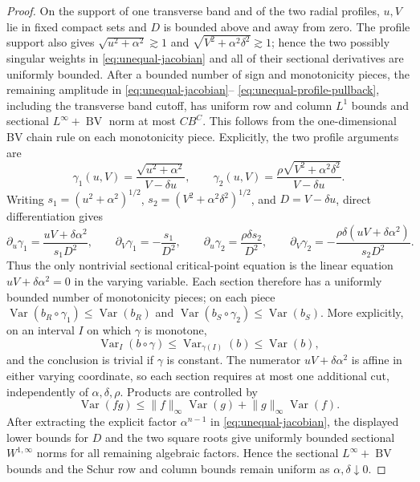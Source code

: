 \documentclass[11pt]{article}
\numberwithin{equation}{section}
\theoremstyle{remark}
\theoremstyle{definition}
\newcommand{\Var}{\operatorname{Var}}
\newcommand{\norm}[1]{\lVert #1\rVert}
\newcommand{\BV}{\operatorname{BV}}
\begin{document}
\begin{proof}
On the support of one transverse band and of the two radial profiles,
\(u,V\) lie in fixed compact sets and \(D\) is bounded above and away
from zero.  The profile support also gives
\(\sqrt{u^2+\alpha^2}\gtrsim1\) and
\(\sqrt{V^2+\alpha^2\delta^2}\gtrsim1\); hence the two possibly singular
weights in \eqref{eq:unequal-jacobian} and all of their sectional
derivatives are uniformly bounded.  After a bounded number of sign and
monotonicity pieces, the remaining amplitude in
\eqref{eq:unequal-jacobian}--
\eqref{eq:unequal-profile-pullback}, including the transverse band
cutoff, has uniform row and column \(L^1\) bounds and sectional
\(L^\infty+\BV\) norm at most \(CB^C\).  This follows from the
one-dimensional BV chain rule on each monotonicity piece.  Explicitly,
the two profile arguments are
\[
 \gamma_1(u,V)=\frac{\sqrt{u^2+\alpha^2}}{V-\delta u},\qquad
 \gamma_2(u,V)=
 \frac{\rho\sqrt{V^2+\alpha^2\delta^2}}{V-\delta u}.
\]
Writing $s_1=(u^2+\alpha^2)^{1/2}$,
$s_2=(V^2+\alpha^2\delta^2)^{1/2}$, and $D=V-\delta u$, direct
differentiation gives
\[
 \partial_u\gamma_1=\frac{uV+\delta\alpha^2}{s_1D^2},\qquad
 \partial_V\gamma_1=-\frac{s_1}{D^2},\qquad
 \partial_u\gamma_2=\frac{\rho\delta s_2}{D^2},\qquad
 \partial_V\gamma_2=-\frac{\rho\delta(uV+\delta\alpha^2)}{s_2D^2}.
\]
Thus the only nontrivial sectional critical-point equation is the linear
equation $uV+\delta\alpha^2=0$ in the varying variable.  Each section
therefore has a uniformly bounded number of monotonicity pieces; on each
piece
$\Var(b_R\circ\gamma_1)\le\Var(b_R)$ and
$\Var(b_S\circ\gamma_2)\le\Var(b_S)$.  More explicitly, on an interval
$I$ on which $\gamma$ is monotone,
\[
 \Var_I(b\circ\gamma)
 \le\Var_{\gamma(I)}(b)\le\Var(b),
\]
and the conclusion is trivial if $\gamma$ is constant.  The numerator
$uV+\delta\alpha^2$ is affine in either varying coordinate, so each
section requires at most one additional cut, independently of
$\alpha,\delta,\rho$.  Products are controlled by
\[
 \Var(fg)\le\norm f_\infty\Var(g)+\norm g_\infty\Var(f).
\]
After extracting the explicit factor $\alpha^{n-1}$ in
\eqref{eq:unequal-jacobian}, the displayed lower bounds for $D$ and
the two square roots give uniformly bounded sectional
$W^{1,\infty}$ norms for all remaining algebraic factors.  Hence the
sectional $L^\infty+\BV$ bounds and the Schur row and column bounds remain
uniform as $\alpha,\delta\downarrow0$.


\end{proof}
\end{document}
